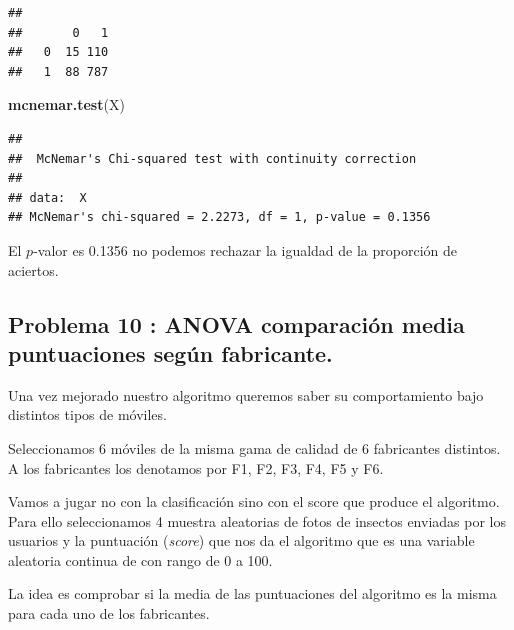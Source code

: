 \documentclass[
]{article}
\newenvironment{Shaded}{\begin{snugshade}}{\end{snugshade}}
\newcommand{\KeywordTok}[1]{\textcolor[rgb]{0.13,0.29,0.53}{\textbf{#1}}}
\newcommand{\NormalTok}[1]{#1}
\newcommand{\OperatorTok}[1]{\textcolor[rgb]{0.81,0.36,0.00}{\textbf{#1}}}
\begin{document}
\begin{Shaded}
\end{Shaded}

\begin{verbatim}
##    
##       0   1
##   0  15 110
##   1  88 787
\end{verbatim}

\begin{Shaded}
\begin{Highlighting}[]
\KeywordTok{mcnemar.test}\NormalTok{(X)}
\end{Highlighting}
\end{Shaded}

\begin{verbatim}
## 
##  McNemar's Chi-squared test with continuity correction
## 
## data:  X
## McNemar's chi-squared = 2.2273, df = 1, p-value = 0.1356
\end{verbatim}

El \(p\)-valor es 0.1356 no podemos rechazar la igualdad de la
proporción de aciertos.

\hypertarget{problema-10-anova-comparaciuxf3n-media-puntuaciones-seguxfan-fabricante.}{%
\subsection{Problema 10 : ANOVA comparación media puntuaciones según
fabricante.}\label{problema-10-anova-comparaciuxf3n-media-puntuaciones-seguxfan-fabricante.}}

Una vez mejorado nuestro algoritmo queremos saber su comportamiento bajo
distintos tipos de móviles.

Seleccionamos 6 móviles de la misma gama de calidad de 6 fabricantes
distintos. A los fabricantes los denotamos por F1, F2, F3, F4, F5 y F6.

Vamos a jugar no con la clasificación sino con el score que produce el
algoritmo. Para ello seleccionamos 4 muestra aleatorias de fotos de
insectos enviadas por los usuarios y la puntuación (\emph{score}) que
nos da el algoritmo que es una variable aleatoria continua de con rango
de 0 a 100.

La idea es comprobar si la media de las puntuaciones del algoritmo es la
misma para cada uno de los fabricantes.
\end{document}
